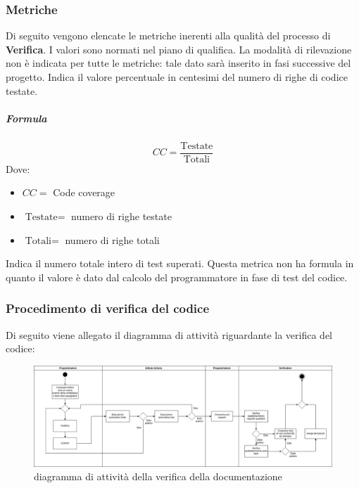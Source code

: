 	\subsubsection{Metriche}
	Di seguito vengono elencate le metriche inerenti alla qualità del processo di \textbf{Verifica}. I valori sono normati nel piano di qualifica. La modalità di rilevazione non è indicata per tutte le metriche: tale dato sarà inserito in fasi successive del progetto.
        Indica il valore percentuale in centesimi del numero di righe di codice testate.
        \subparagraph{Formula}
        \begin{displaymath}
          CC = \frac{\textrm{Testate}}{\textrm{Totali}}
        \end{displaymath}
        Dove:
        \begin{itemize}
        \item[] $CC =$ Code coverage
        \item[] $\textrm{Testate} =$ numero di righe testate
        \item[] $\textrm{Totali} =$ numero di righe totali
        \end{itemize}
        
        
        Indica il numero totale intero di test superati. Questa metrica non ha formula in quanto il valore è dato dal calcolo del programmatore in fase di test del codice.
	
	   \subsubsection{Procedimento di verifica del codice}
		Di seguito viene allegato il diagramma di attività riguardante la verifica del codice:
		\begin{figure}[hbt!]
	       \centering \includegraphics[width=1.0\textwidth]{source/images/verificaCodice.png}
	        \caption{diagramma di attività della verifica della documentazione}
	    \end{figure}

